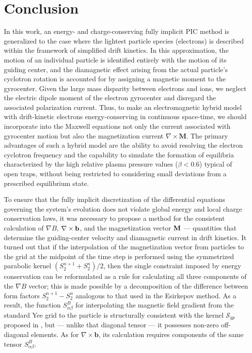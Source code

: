 \documentclass[final,3p]{elsarticle}
\begin{document}
   





\section{Conclusion}\label{s5}

In this work, an energy- and charge-conserving fully implicit PIC method is generalized to the case where the lightest particle species (electrons) is described within the framework of simplified drift kinetics. In this approximation, the motion of an individual particle is identified entirely with the motion of its guiding center, and the diamagnetic effect arising from the actual particle's cyclotron rotation is accounted for by assigning a magnetic moment to the gyrocenter. Given the large mass disparity between electrons and ions, we neglect the electric dipole moment of the electron gyrocenter and disregard the associated polarization current. Thus, to make an electromagnetic hybrid model with drift-kinetic electrons energy-conserving in continuous space-time, we should incorporate into the Maxwell equations  not only the current associated with gyrocenter motion but also the magnetization current $\nabla \times \mathbf{M}$.
The primary advantages of such a hybrid model are the ability to avoid resolving the electron cyclotron frequency and the capability to simulate the formation of equilibria characterized by the high relative plasma pressure values ($\beta < 0.6$) typical of open traps, without being restricted to considering small deviations from a prescribed equilibrium state.

To ensure that the fully implicit discretization of the differential equations governing the system's evolution does not violate global energy and local charge conservation laws, it was necessary to propose a method for the consistent calculation of $\nabla B$, $\nabla \times {\bf b}$, and the magnetization vector ${\bf M}$ --- quantities that determine the guiding-center velocity and diamagnetic current in drift kinetics. It turned out that if the interpolation of the magnetization vector from particles to the grid at the midpoint of the time step is performed using the symmetrized parabolic kernel $(S_2^{n+1}+S_2^{n})/2$, then the single constraint imposed by energy conservation can be reformulated as a rule for calculating all three components of the $\nabla B$ vector; this is made possible by a decomposition of the difference between form factors $S_2^{n+1}-S_2^{n}$ analogous to that used in the Esirkepov method.
As a result, the function $S_{\alpha\beta}^B$ for interpolating the magnetic field gradient from the standard Yee grid to the particle is structurally consistent with the kernel $\mathcal{S}_{gp}$ proposed in \cite{Chen2023}, but --- unlike that diagonal tensor --- it possesses non-zero off-diagonal elements. As for $\nabla \times \mathbf{b}$, its calculation requires components of the same tensor $S_{\alpha\beta}^B$.
\end{document}
